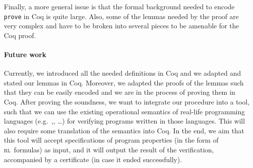 \documentclass[10pt,a4wide]{article}
\newcommand{\RL}{\textsc{rl}~}
\begin{document}
Finally, a more general  issue is that the formal background needed to encode \texttt{prove} in Coq is quite large. Also, some of the lemmas needed by the proof are very complex and have to be broken into several pieces to be amenable for the Coq proof.

\paragraph{Future work}
Currently, we introduced all the needed definitions in Coq and we adapted and stated our lemmas in Coq. Moreover, we adapted the proofs of the lemmas such that they can be easily encoded and we are in the process of proving them in Coq. After proving the soundness, we want to integrate our procedure into a tool, such that we can use the existing operational semantics of real-life programming languages (e.g.~\cite{ellison-rosu-2012-popl},\cite{bogdanas-rosu-2015-popl}, \ldots) for verifying programs written in those languages. 
This will also require some translation of the semantics into Coq. 
In the end, we aim that this tool will accept specifications of program properties (in the form of \RL formulas) as input, and it will  output the result of the verification, accompanied by a certificate (in case it ended successfully).




\end{document}
